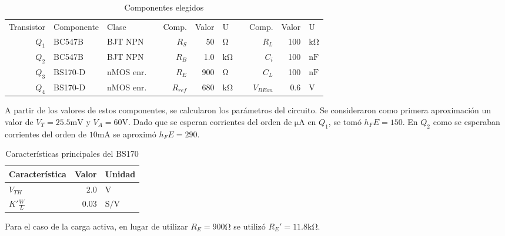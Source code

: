 \begin{table}[ht]
    \centering
    \begin{tabular}{|r|l|l|l|r|r|l|l|r|r|l|}
    \cline{1-3} \cline{5-7} \cline{9-11}
    Transistor & Componente & Clase       &  & Comp.      & Valor & U                &  & Comp. & Valor & U                  \\ \cline{1-3} \cline{5-7} \cline{9-11} 
    $Q_1$      & BC547B     & BJT NPN     &  & $R_S$      & 50   & $\si{\ohm}$ &  & $R_L$      & 100   & $\si{\kilo\ohm}$   \\
    $Q_2$      & BC547B     & BJT NPN     &  & $R_B$      & 1.0   & $\si{\kilo\ohm}$ &  & $C_i$      & 100   & $\si{\nano\farad}$ \\
    $Q_3$      & BS170-D    & nMOS enr.  &  & $R_E$      & 900   & $\si{\ohm}$ &  & $C_L$      & 100   & $\si{\nano\farad}$ \\
    $Q_4$      & BS170-D    & nMOS enr. &  & $R_{ref}$  & 680   & $\si{\kilo\ohm}$ &  &           $V_{BEon}$& 0.6   &   $\si{\volt}$  \\ \cline{1-3} \cline{5-7} \cline{9-11} 
    \end{tabular}
    \caption{Componentes elegidos}
\end{table}

A partir de los valores de estos componentes, se calcularon los parámetros del circuito. Se consideraron como primera aproximación un valor de $V_T = 25.5 \si{\milli\volt}$ y $V_A = 60 \si{\volt}$. Dado que se esperan corrientes del orden de $\si{\micro\ampere}$ en $Q_1$, se tomó $h_FE = 150$. En $Q_2$ como se esperaban corrientes del orden de $10\si{\milli\ampere}$ se aproximó $h_FE = 290$.

\begin{table}
    \centering
    \begin{tabular}{|l|r|l|}
        \hline
        Característica  &   Valor   &   Unidad  \\
        \hline
        $V_{TH}$    &   $2.0$   &   $\si{\volt}$    \\
        $K'\frac{W}{L}$&$0.03$  &   $\si{\siemens/\volt}$ \\
        \hline
    \end{tabular}
    \caption{Características principales del BS170}
\end{table}

Para el caso de la carga activa, en lugar de utilizar $R_E = 900\si{\ohm}$ se utilizó $R_E' = 11.8 \si{\kilo\ohm}$.

